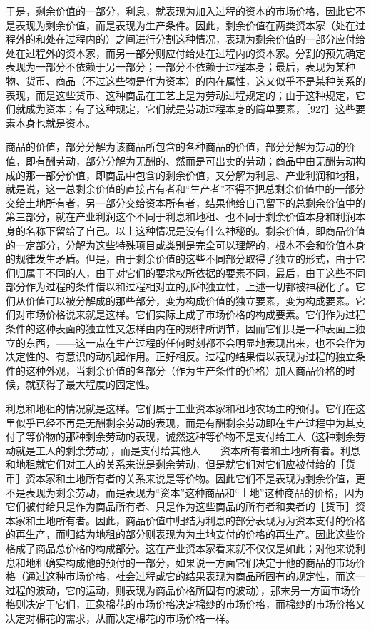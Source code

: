于是，剩余价值的一部分，利息，就表现为加入过程的资本的市场价格，因此它不是表现为剩余价值，而是表现为生产条件。因此，剩余价值在两类资本家（处在过程外的和处在过程内的）之间进行分割这种情况，表现为剩余价值的一部分应付给处在过程外的资本家，而另一部分则应付给处在过程内的资本家。分割的预先确定表现为一部分不依赖于另一部分；一部分不依赖于过程本身；最后，表现为某种物、货币、商品（不过这些物是作为资本）的内在属性，这又似乎不是某种关系的表现，而是这些货币、这种商品在工艺上是为劳动过程规定的；由于这种规定，它们就成为资本；有了这种规定，它们就是劳动过程本身的简单要素，［927］这些要素本身也就是资本。

商品的价值，部分分解为该商品所包含的各种商品的价值，部分分解为劳动的价值，即有酬劳动，部分分解为无酬的、然而是可出卖的劳动；商品中由无酬劳动构成的那一部分价值，即商品中包含的剩余价值，又分解为利息、产业利润和地租，就是说，这一总剩余价值的直接占有者和“生产者”不得不把总剩余价值中的一部分交给土地所有者，另一部分交给资本所有者，结果他给自己留下的总剩余价值中的第三部分，就在产业利润这个不同于利息和地租、也不同于剩余价值本身和利润本身的名称下留给了自己。以上这种情况是没有什么神秘的。剩余价值，即商品价值的一定部分，分解为这些特殊项目或类别是完全可以理解的，根本不会和价值本身的规律发生矛盾。但是，由于剩余价值的这些不同部分取得了独立的形式，由于它们归属于不同的人，由于对它们的要求权所依据的要素不同，最后，由于这些不同部分作为过程的条件借以和过程相对立的那种独立性，上述一切都被神秘化了。它们从价值可以被分解成的那些部分，变为构成价值的独立要素，变为构成要素。它们对市场价格说来就是这样。它们实际上成了市场价格的构成要素。它们作为过程条件的这种表面的独立性又怎样由内在的规律所调节，因而它们只是一种表面上独立的东西，——这一点在生产过程的任何时刻都不会明显地表现出来，也不会作为决定性的、有意识的动机起作用。正好相反。过程的结果借以表现为过程的独立条件的这种外观，当剩余价值的各部分（作为生产条件的价格）加入商品价格的时候，就获得了最大程度的固定性。

利息和地租的情况就是这样。它们属于工业资本家和租地农场主的预付。它们在这里似乎已经不再是无酬剩余劳动的表现，而是有酬剩余劳动即在生产过程中为其支付了等价物的那种剩余劳动的表现，诚然这种等价物不是支付给工人（这种剩余劳动就是工人的剩余劳动），而是支付给其他人——资本所有者和土地所有者。利息和地租就它们对工人的关系来说是剩余劳动，但是就它们对它们应被付给的［货币］资本家和土地所有者的关系来说是等价物。因此它们不是表现为剩余价值，更不是表现为剩余劳动，而是表现为“资本”这种商品和“土地”这种商品的价格，因为它们被付给只是作为商品所有者、只是作为这些商品的所有者和卖者的［货币］资本家和土地所有者。因此，商品价值中归结为利息的部分表现为为资本支付的价格的再生产，而归结为地租的部分则表现为为土地支付的价格的再生产。因此这些价格成了商品总价格的构成部分。这在产业资本家看来就不仅仅是如此；对他来说利息和地租确实构成他的预付的一部分，如果说一方面它们决定于他的商品的市场价格（通过这种市场价格，社会过程或它的结果表现为商品所固有的规定性，而这一过程的波动，它的运动，则表现为商品价格所固有的波动），那末另一方面市场价格则决定于它们，正象棉花的市场价格决定棉纱的市场价格，而棉纱的市场价格又决定对棉花的需求，从而决定棉花的市场价格一样。

